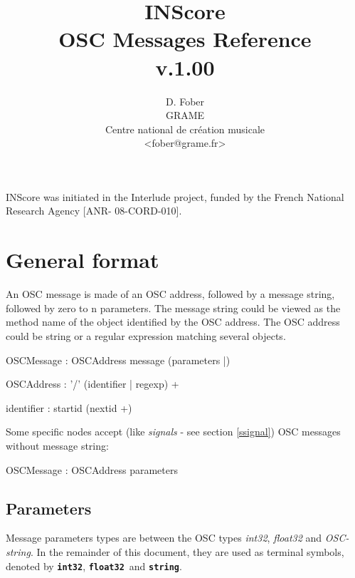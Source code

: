 \documentclass[a4paper,twoside]{report}
\newcommand{\toplevel}[1]	{\chapter{#1}}
\newcommand{\sublevel}[1]	{\section{#1}}
\newcommand{\osctype}[1]{\textbf{\texttt{{\small #1}}}}
\newcommand{\oscint}{\osctype{int32}}
\newcommand{\oscfloat}{\osctype{float32}}
\newcommand{\oscstring}{\osctype{string}}
\begin{document}
\title{INScore \\ OSC Messages Reference \\v.1.00}

\author{D. Fober\\ GRAME\\ Centre national de cr\'eation musicale\\
{\small <fober@grame.fr>} \\
}

\maketitle

\vspace*{22cm}
{\small INScore was initiated in the Interlude project, funded by the French National Research Agency [ANR- 08-CORD-010].}
  

\pagestyle{empty}
\cleardoublepage
\tableofcontents
\newpage
\pagestyle{plain}
\setcounter{page}{1}

\toplevel{General format}
\label{genformat}
An OSC message is made of an OSC address, followed by a message string, followed by zero to n parameters. The message string could be viewed as the method name of the object identified by the OSC address.
The OSC address could be string or a regular expression matching several objects.
\begin{rail}
OSCMessage : OSCAddress message (parameters |)
\end{rail}

\begin{rail}
OSCAddress : '/' (identifier | regexp) +
\end{rail}

\railalias{nextid}{[-\_a-zA-Z0-9]]}
\begin{rail}
identifier : startid (nextid +)
\end{rail}

Some specific nodes accept (like \emph{signals} - see section \ref{ssignal}) OSC messages without message string:
\begin{rail}
OSCMessage : OSCAddress parameters
\end{rail}

\sublevel{Parameters}

Message parameters types are between the OSC types \emph{int32}, \emph{float32} and \emph{OSC-string}. In the remainder of this document, they are used as terminal symbols, denoted by \oscint, \oscfloat\ and \oscstring. 
\end{document}
